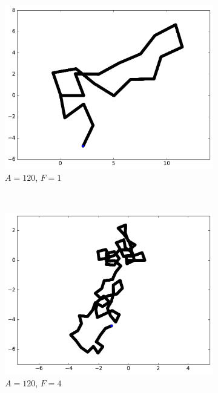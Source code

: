 \begin{appendices}
\begin{figure}[htbp]
\begin{subfigure}[t]{\subImgWmo}
			\includegraphics[width=\textwidth]{figures/ch3/synTraj_219_120_1}
			\caption[$A = 120$, $F=1$]{$A = 120$, $F=1$}
			\label{fig:synTraj_219_120_1}
		\end{subfigure}
		~
		\begin{subfigure}[t]{\subImgWmo}
			\centering
			\includegraphics[width=\textwidth]{figures/ch3/synTraj_219_120_4}
			\caption[$A = 120$, $F=4$]{$A = 120$, $F=4$}
			\label{fig:synTraj_219_120_4}
		\end{subfigure}
		~
		\begin{subfigure}[t]{\subImgWmo}
			\centering

\end{subfigure}
\end{figure}
\end{appendices}
